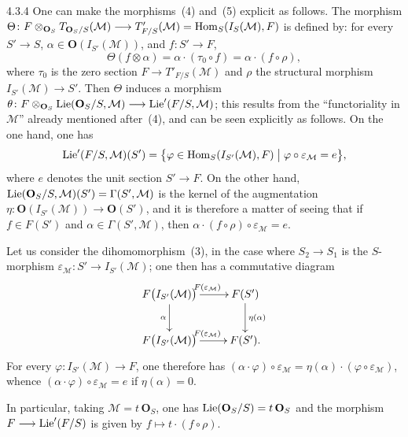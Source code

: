 \begin{remark}{4.3.4}\label{II.4.3.4}
{\renewcommand{\thefootnote}{(66)}}
One can make the morphisms~(4) and~(5) explicit as follows. The morphism
\(\Theta\colon F\otimes_{\mathbf{O}_{S}}T_{\mathbf{O}_{S}/S}(\mathcal{M})
\longrightarrow T'_{F/S}(\mathcal{M})
=\operatorname{Hom}_{S}(I_{S}(\mathcal{M}),F)\)
is defined by: for every \(S'\to S\),
\(\alpha\in\mathbf{O}(I_{S'}(\mathcal{M}))\), and \(f\colon S'\to F\),
\[
\Theta(f\otimes\alpha)=\alpha\cdot(\tau_{0}\circ f)=\alpha\cdot(f\circ\rho),
\]
where \(\tau_{0}\) is the zero section \(F\to T'_{F/S}(\mathcal{M})\) and
\(\rho\) the structural morphism \(I_{S'}(\mathcal{M})\to S'\). Then
\(\Theta\) induces a morphism
\(\theta\colon F\otimes_{\mathbf{O}_{S}}\operatorname{Lie}(\mathbf{O}_{S}/S,\mathcal{M})
\longrightarrow\operatorname{Lie}'(F/S,\mathcal{M})\); this results from the ``functoriality in
\(\mathcal{M}\)'' already mentioned after~(4), and can be seen explicitly as
follows. On the one hand, one has
\[
\operatorname{Lie}'(F/S,\mathcal{M})(S')
=
\bigl\{\varphi\in\operatorname{Hom}_{S}(I_{S'}(\mathcal{M}),F)
\bigm|\varphi\circ\varepsilon_{\mathcal{M}}=e\bigr\},
\]
where \(e\) denotes the unit section \(S'\to F\). On the other hand,
\(\operatorname{Lie}(\mathbf{O}_{S}/S,\mathcal{M})(S')=\Gamma(S',\mathcal{M})\) is the
kernel of the augmentation
\(\eta\colon\mathbf{O}(I_{S'}(\mathcal{M}))\to\mathbf{O}(S')\), and it is
therefore a matter of seeing that if \(f\in F(S')\) and
\(\alpha\in\Gamma(S',\mathcal{M})\), then
\(\alpha\cdot(f\circ\rho)\circ\varepsilon_{\mathcal{M}}=e\).

Let us consider the dihomomorphism~(3), in the case where \(S_{2}\to S_{1}\)
is the \(S\)-morphism
\(\varepsilon_{\mathcal{M}}\colon S'\to I_{S'}(\mathcal{M})\); one then has
a commutative diagram
\[
\xymatrix{
F\bigl(I_{S'}(\mathcal{M})\bigr)
  \ar[r]^{F(\varepsilon_{\mathcal{M}})}
  \ar[d]_{\alpha}
&
F(S')
  \ar[d]^{\eta(\alpha)}
\\
F\bigl(I_{S'}(\mathcal{M})\bigr)
  \ar[r]^{F(\varepsilon_{\mathcal{M}})}
&
F(S')
.}
\]
For every \(\varphi\colon I_{S'}(\mathcal{M})\to F\), one therefore has
\((\alpha\cdot\varphi)\circ\varepsilon_{\mathcal{M}}
=\eta(\alpha)\cdot(\varphi\circ\varepsilon_{\mathcal{M}})\), whence
\((\alpha\cdot\varphi)\circ\varepsilon_{\mathcal{M}}=e\) if
\(\eta(\alpha)=0\).

In particular, taking \(\mathcal{M}=t\,\mathbf{O}_{S}\), one has
\(\operatorname{Lie}(\mathbf{O}_{S}/S)=t\,\mathbf{O}_{S}\) and the morphism
\(F\longrightarrow\operatorname{Lie}'(F/S)\) is given by \(f\mapsto t\cdot(f\circ\rho)\).
\end{remark}

